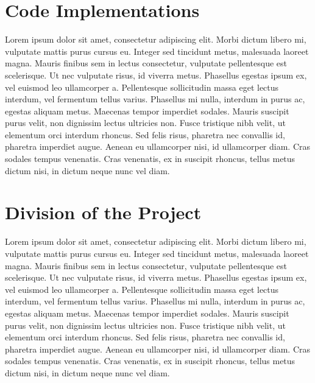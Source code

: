 \documentclass[11pt]{article}
\theoremstyle{definition}
\theoremstyle{remark}
\begin{document}
\section{Code Implementations}
Lorem ipsum dolor sit amet, consectetur adipiscing elit. Morbi dictum libero mi, vulputate mattis purus cursus eu. Integer sed tincidunt metus, malesuada laoreet magna. Mauris finibus sem in lectus consectetur, vulputate pellentesque est scelerisque. Ut nec vulputate risus, id viverra metus. Phasellus egestas ipsum ex, vel euismod leo ullamcorper a. Pellentesque sollicitudin massa eget lectus interdum, vel fermentum tellus varius. Phasellus mi nulla, interdum in purus ac, egestas aliquam metus. Maecenas tempor imperdiet sodales. Mauris suscipit purus velit, non dignissim lectus ultricies non. Fusce tristique nibh velit, ut elementum orci interdum rhoncus. Sed felis risus, pharetra nec convallis id, pharetra imperdiet augue. Aenean eu ullamcorper nisi, id ullamcorper diam. Cras sodales tempus venenatis. Cras venenatis, ex in suscipit rhoncus, tellus metus dictum nisi, in dictum neque nunc vel diam. 

\section{Division of the Project}
Lorem ipsum dolor sit amet, consectetur adipiscing elit. Morbi dictum libero mi, vulputate mattis purus cursus eu. Integer sed tincidunt metus, malesuada laoreet magna. Mauris finibus sem in lectus consectetur, vulputate pellentesque est scelerisque. Ut nec vulputate risus, id viverra metus. Phasellus egestas ipsum ex, vel euismod leo ullamcorper a. Pellentesque sollicitudin massa eget lectus interdum, vel fermentum tellus varius. Phasellus mi nulla, interdum in purus ac, egestas aliquam metus. Maecenas tempor imperdiet sodales. Mauris suscipit purus velit, non dignissim lectus ultricies non. Fusce tristique nibh velit, ut elementum orci interdum rhoncus. Sed felis risus, pharetra nec convallis id, pharetra imperdiet augue. Aenean eu ullamcorper nisi, id ullamcorper diam. Cras sodales tempus venenatis. Cras venenatis, ex in suscipit rhoncus, tellus metus dictum nisi, in dictum neque nunc vel diam. 
\end{document}
